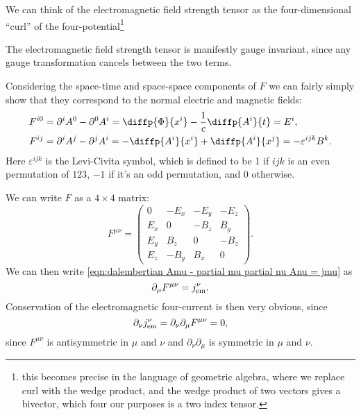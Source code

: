 We can think of the electromagnetic field strength tensor as the four-dimensional \enquote{curl} of the four-potential\footnote{this becomes precise in the language of geometric algebra, where we replace curl with the wedge product, and the wedge product of two vectors gives a bivector, which four our purposes is a two index tensor.}

The electromagnetic field strength tensor is manifestly gauge invariant, since any gauge transformation cancels between the two terms.

Considering the space-time and space-space components of \(F\) we can fairly simply show that they correspond to the normal electric and magnetic fields:
\begin{align}
    F^{i0} &= \partial^iA^0 - \partial^0A^i = \diffp{\Phi}{x^i} - \frac{1}{c}\diffp{A^i}{t} = E^i,\\
    F^{ij} &= \partial^iA^j - \partial^jA^i = -\diffp{A^i}{x^i} + \diffp{A^i}{x^j} = -\varepsilon^{ijk}B^k.
\end{align}
Here \(\varepsilon^{ijk}\) is the Levi-Civita symbol, which is defined to be 1 if \(ijk\) is an even permutation of \(123\), \(-1\) if it's an odd permutation, and 0 otherwise.

We can write \(F\) as a \(4 \times 4\) matrix:
\begin{equation}
    F^{\mu\nu} =
    \begin{pmatrix}
        0 & -E_x & -E_y & -E_z\\
        E_x & 0 & -B_z & B_y\\
        E_y & B_z & 0 & -B_z\\
        E_z & -B_y & B_x & 0
    \end{pmatrix} 
    .
\end{equation}
We can then write \cref{eqn:dalembertian Amu - partial mu partial nu Anu = jmu} as
\begin{equation}
    \partial_\mu F^{\mu\nu} = j_{\text{em}}^{\nu}.
\end{equation}
Conservation of the electromagnetic four-current is then very obvious, since
\begin{equation}
    \partial_\nu j_{\text{em}}^\nu = \partial_\nu \partial_\mu F^{\mu\nu} = 0,
\end{equation}
since \(F^{\mu\nu}\) is antisymmetric in \(\mu\) and \(\nu\) and \(\partial_\nu\partial_\mu\) is symmetric in \(\mu\) and \(\nu\).

